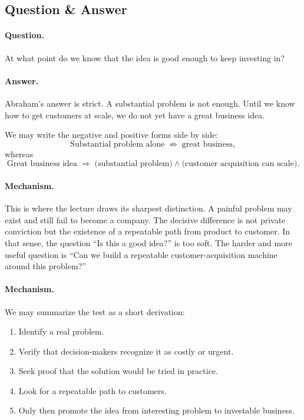 \subsection{Question \& Answer}

\paragraph{Question.} At what point do we know that the idea is good enough to keep investing in?

\paragraph{Answer.} Abraham's answer is strict. A substantial problem is not enough. Until we know how to get customers at scale, we do not yet have a great business idea.

We may write the negative and positive forms side by side:
\begin{equation}
\text{Substantial problem alone}
\;\not\Rightarrow\;
\text{great business},
\end{equation}
whereas
\begin{equation}
\text{Great business idea}
\;\Rightarrow\;
\bigl(\text{substantial problem}\bigr)
\land
\bigl(\text{customer acquisition can scale}\bigr).
\end{equation}

\paragraph{Mechanism.} This is where the lecture draws its sharpest distinction. A painful problem may exist and still fail to become a company. The decisive difference is not private conviction but the existence of a repeatable path from product to customer. In that sense, the question ``Is this a good idea?'' is too soft. The harder and more useful question is ``Can we build a repeatable customer-acquisition machine around this problem?''

\paragraph{Mechanism.} We may summarize the test as a short derivation:
\begin{enumerate}
\item Identify a real problem.
\item Verify that decision-makers recognize it as costly or urgent.
\item Seek proof that the solution would be tried in practice.
\item Look for a repeatable path to customers.
\item Only then promote the idea from interesting problem to investable business.
\end{enumerate}

